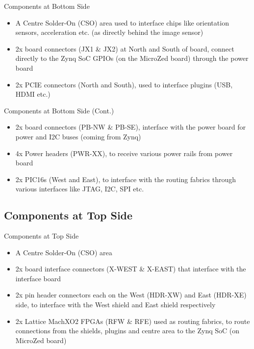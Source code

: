 \documentclass{beamer}
\begin{document}
\begin{frame}{Components at Bottom Side}
    \begin{itemize}
    \item A Centre Solder-On (CSO) area used to interface chips like orientation sensors,
        acceleration etc. (as directly behind the image sensor)
    \item 2x board connectors (JX1 \& JX2) at North and South of board, connect directly
        to the Zynq SoC GPIOs (on the MicroZed board) through the power board
    \item 2x PCIE connectors (North and South), used to interface plugins (USB, HDMI etc.)
    \end{itemize}
\end{frame}

\begin{frame}{Components at Bottom Side (Cont.)}
    \begin{itemize}
    \item 2x board connectors (PB-NW \& PB-SE), interface with the power board for
        power and I2C buses (coming from Zynq)
    \item 4x Power headers (PWR-XX), to receive various power rails from power board
    \item 2x PIC16s (West and East), to interface with the routing fabrics through
        various interfaces like JTAG, I2C, SPI etc.
    \end{itemize}
\end{frame}

\subsection{Components at Top Side}

\begin{frame}{Components at Top Side}
    \begin{itemize}
    \item A Centre Solder-On (CSO) area
    \item 2x board interface connectors (X-WEST \& X-EAST) that interface with the 
        interface board 
    \item 2x pin header connectors each on the West (HDR-XW) and East (HDR-XE) side, to 
        interface with the West shield and East shield respectively
    \item 2x Lattice MachXO2 FPGAs (RFW \& RFE) used as routing fabrics, to route connections
        from the shields, plugins and centre area to the Zynq SoC (on MicroZed board)
    \end{itemize}
\end{frame}
\end{document}
